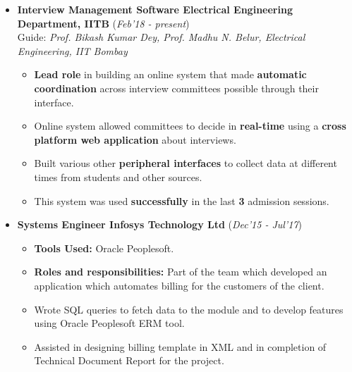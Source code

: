 \documentclass[10pt]{article}
\begin{document}
\vspace{-0.1cm}
\begin{itemize}[leftmargin=0.4cm]
	\item \textbf{Interview Management Software \textpipe  \hspace{0.05cm} Electrical Engineering Department, IITB} \hfill{(\textit{Feb'18 - present})}\\
	Guide: \textit{Prof. Bikash Kumar Dey, Prof. Madhu N. Belur, Electrical Engineering, IIT Bombay}\\
\vspace{-0.65cm}
\begin{itemize}

		\item \textbf{Lead role }in building an online system that made \textbf{automatic
coordination }across interview committees possible through their interface.\vspace{-0.1cm}
		\item Online system allowed committees to decide in \textbf{real-time} using a \textbf{cross platform web application} about interviews.
		\item Built various other \textbf{peripheral
interfaces} to collect data at different times from students and other sources.
		\item This system was used \textbf{successfully} in the last \textbf{3} admission sessions.
	\end{itemize}
\end{itemize}
\vspace{-0.55cm}
\begin{itemize}[leftmargin=0.4cm]
	\item \textbf{Systems Engineer \textpipe  \hspace{0.05cm} Infosys Technology Ltd} \hfill{(\textit{Dec'15 - Jul'17})}\\
	\vspace{-0.65cm}
	\begin{itemize}
	    \item  \textbf{Tools Used:} Oracle Peoplesoft.\vspace{-0.07cm}
		\item \textbf{Roles and responsibilities:} Part of the team which developed an application which automates billing for the customers of the client.\vspace{-0.1cm}
		\item Wrote SQL queries to fetch data to the module and to develop features using Oracle Peoplesoft ERM tool.
		\item Assisted in designing billing template in XML and in completion of Technical Document Report for the project.
	
	\end{itemize}
\end{itemize}
\end{document}
